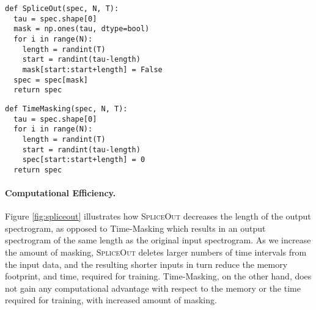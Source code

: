 \documentclass{article}
\newcommand{\SpA}{{\textsc{SpliceOut}}\xspace}
\begin{document}
\begin{minipage}{0.46\linewidth}
\begin{algorithm}[H]
\caption{Pseudocode for \SpA}
\label{alg:spliceout}
\begin{verbatim}
def SpliceOut(spec, N, T):
  tau = spec.shape[0]
  mask = np.ones(tau, dtype=bool)
  for i in range(N):
    length = randint(T)
    start = randint(tau-length)
    mask[start:start+length] = False
  spec = spec[mask]
  return spec
\end{verbatim}
\end{algorithm}
\end{minipage}
\hfill
\begin{minipage}{0.46\linewidth}
\begin{algorithm}[H]
\caption{Pseudocode for Time-Masking}
\label{alg:tm}
\begin{verbatim}
def TimeMasking(spec, N, T):
  tau = spec.shape[0]
  for i in range(N):
    length = randint(T)
    start = randint(tau-length)
    spec[start:start+length] = 0
  return spec
\end{verbatim}
\end{algorithm}
\end{minipage}
\paragraph{Computational Efficiency.} 

Figure \ref{fig:spliceout} illustrates how \SpA decreases the length of the output spectrogram, as opposed to Time-Masking which results in an output spectrogram of the same length as the original input spectrogram. As we increase the amount of masking, \SpA deletes larger numbers of time intervals from the input data, and the resulting shorter inputs in turn reduce the memory footprint, and time, required for training. Time-Masking, on the other hand, does not gain any computational advantage with respect to the memory or the time required for training, with increased amount of masking.
\end{document}

